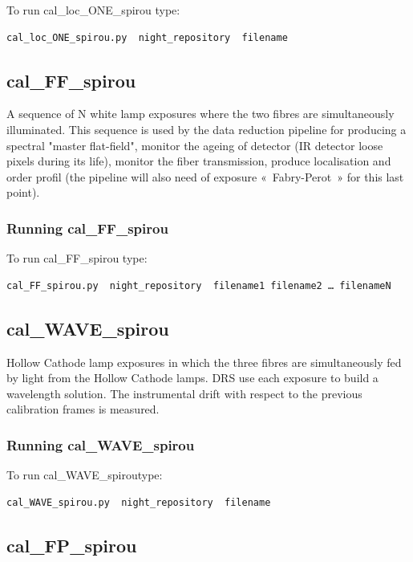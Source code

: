 To run cal\_loc\_ONE\_spirou type:
\begin{lstlisting}[language=bash, style=bashstyle]
cal_loc_ONE_spirou.py  night_repository  filename
\end{lstlisting}


\subsection{cal\_FF\_spirou}

A sequence of N white lamp exposures where the two fibres are simultaneously illuminated. This sequence is used by the data reduction pipeline for producing a spectral "master flat-field", monitor the ageing of detector (IR detector loose pixels during its life), monitor the fiber transmission, produce localisation and order profil (the pipeline will also need of exposure « Fabry-Perot » for this last point).

\subsubsection{Running cal\_FF\_spirou}

To run cal\_FF\_spirou type:
\begin{lstlisting}[language=bash, style=bashstyle]
cal_FF_spirou.py  night_repository  filename1 filename2 … filenameN
\end{lstlisting}


\subsection{cal\_WAVE\_spirou}

Hollow Cathode lamp exposures in which the three fibres are simultaneously fed by light from the Hollow Cathode lamps. DRS use each exposure to build a wavelength solution. The instrumental drift with respect to the previous calibration frames is measured.

\subsubsection{Running cal\_WAVE\_spirou}

To run cal\_WAVE\_spiroutype:
\begin{lstlisting}[language=bash, style=bashstyle]
cal_WAVE_spirou.py  night_repository  filename
\end{lstlisting}



\subsection{cal\_FP\_spirou}

